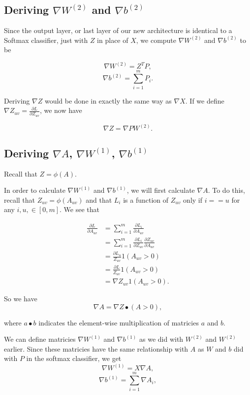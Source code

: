 \subsection{Deriving $\nabla W^{(2)}$ and $\nabla b^{(2)}$}
Since the output layer, or last layer of our new architecture is identical to a
Softmax classifier, just with $Z$ in place of $X$, we compute $\nabla
W^{(2)}$ and $\nabla b^{(2)}$ to be

$$ \nabla W^{(2)}  = Z^T P, $$
$$ \nabla b^{(2)}  = \sum_{i=1}^m P_i. $$

Deriving $\nabla Z$ would be done in exactly the same way as $\nabla X$. If
we define $\nabla Z_{uv} = \frac{\partial L}{\partial Z_{uv}}$, we now have

$$ \nabla Z = \nabla P W^{(2)}. $$

\subsection{Deriving $\nabla A$, $\nabla W^{(1)}$, $\nabla b^{(1)}$}
Recall that $Z = \phi(A).$

In order to calculate $\nabla W^{(1)}$ and $\nabla b^{(1)}$, we will first
calculate $\nabla A$. To do this, recall that $Z_{uv} = \phi(A_{uv})$
and that $L_i$ is a function of $Z_{uv}$ only if $i == u$ for any $i, u, \in
[0, m]$. We see that

\begin{align*}
  \frac{\partial L}{\partial A_{uv}}
  &= \sum_{i=1}^m \frac{\partial L_i}{\partial A_{uv}}\\
  &= \sum_{i=1}^m \frac{\partial L_i}{\partial Z_{uv}} \frac{\partial
  Z_{uv}}{\partial A_{uv}}\\
  &= \frac{\partial L_u}{Z_{uv}} 1(A_{uv} > 0)\\
  &= \frac{\partial L}{Z_{uv}} 1(A_{uv} > 0)\\
  &= \nabla Z_{uv} 1(A_{uv} > 0).
\end{align*}

So we have
$$ \nabla A = \nabla Z \bullet (A > 0), $$

where $a \bullet b$ indicates the element-wise multiplication of matricies $a$ and $b$.

We can define matricies $\nabla W^{(1)}$ and $\nabla b^{(1)}$ as we did with $W^{(2)}$ and
$W^{(2)}$ earlier. Since these matricies have the same relationship with $A$ as
$W$ and $b$ did with $P$ in the softmax classifier, we get
$$ \nabla W^{(1)} = X \nabla A, $$
$$ \nabla b^{(1)} = \sum_{i=1}^m \nabla A_i,$$

